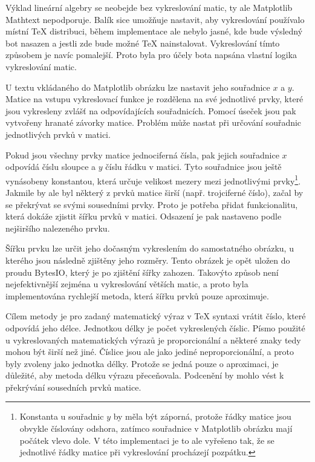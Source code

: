 \documentclass[FM]{tulthesis}
\begin{document}
	Výklad lineární algebry se neobejde bez vykreslování matic, ty ale Matplotlib Mathtext nepodporuje. Balík sice umožňuje nastavit, aby vykreslování používalo místní TeX distribuci, během implementace ale nebylo jasné, kde bude výsledný bot nasazen a jestli zde bude možné TeX nainstalovat. Vykreslování tímto způsobem je navíc pomalejší. Proto byla pro účely bota napsána vlastní logika vykreslování matic.
	
	U textu vkládaného do Matplotlib obrázku lze nastavit jeho souřadnice $x$ a $y$. Matice na vstupu vykreslovací funkce je rozdělena na své jednotlivé prvky, které jsou vykresleny zvlášť na odpovídajících souřadnicích. Pomocí úseček jsou pak vytvořeny hranaté závorky matice. Problém může nastat při určování souřadnic jednotlivých prvků v matici.
	
	Pokud jsou všechny prvky matice jednociferná čísla, pak jejich souřadnice $x$ odpovídá číslu sloupce a $y$ číslu řádku v matici. Tyto souřadnice jsou ještě vynásobeny konstantou, která určuje velikost mezery mezi jednotlivými prvky\footnote{Konstanta u souřadnic $y$ by měla být záporná, protože řádky matice jsou obvykle číslovány odshora, zatímco souřadnice v Matplotlib obrázku mají počátek vlevo dole. V této implementaci je to ale vyřešeno tak, že se jednotlivé řádky matice při vykreslování procházejí pozpátku.}. Jakmile by ale byl některý z prvků matice širší (např. trojciferné číslo), začal by se překrývat se svými sousedními prvky. Proto je potřeba přidat funkcionalitu, která dokáže zjistit šířku prvků v matici. Odsazení je pak nastaveno podle nejširšího nalezeného prvku.
	
	Šířku prvku lze určit jeho dočasným vykreslením do samostatného obrázku, u kterého jsou následně zjištěny jeho rozměry. Tento obrázek je opět uložen do proudu BytesIO, který je po zjištění šířky zahozen. Takovýto způsob není nejefektivnější zejména u vykreslování větších matic, a proto byla implementována rychlejší metoda, která šířku prvků pouze aproximuje.

	Cílem metody je pro zadaný matematický výraz v TeX syntaxi vrátit číslo, které odpovídá jeho délce. Jednotkou délky je počet vykreslených číslic. Písmo použité u vykreslovaných matematických výrazů je proporcionální a některé znaky tedy mohou být širší než jiné. Číslice jsou ale jako jediné neproporcionální, a proto byly zvoleny jako jednotka délky. Protože se jedná pouze o aproximaci, je důležité, aby metoda délku výrazu přeceňovala. Podcenění by mohlo vést k překrývání sousedních prvků matice.
		
\end{document}
